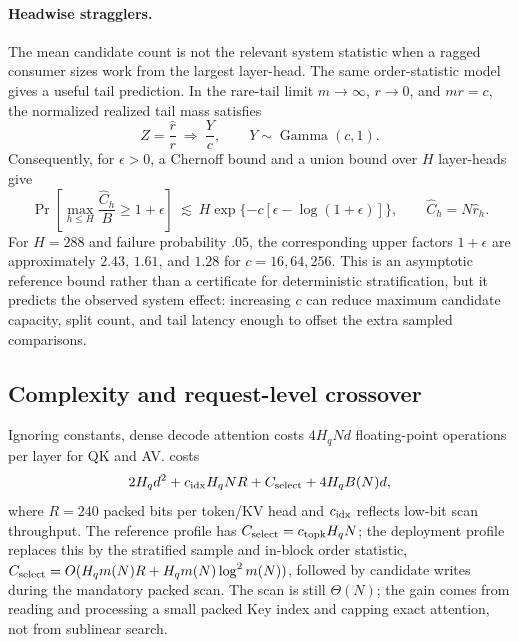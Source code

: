 \paragraph{Headwise stragglers.}
The mean candidate count is not the relevant system statistic when a ragged
consumer sizes work from the largest layer-head.  The same order-statistic
model gives a useful tail prediction.  In the rare-tail limit
$m\rightarrow\infty$, $r\rightarrow0$, and $mr=c$, the normalized realized
tail mass satisfies
\begin{equation}
 Z=\frac{\widehat r}{r}
 \ \Longrightarrow\ \frac{Y}{c},
 \qquad Y\sim\operatorname{Gamma}(c,1).
 \label{eq:quantile-gamma-limit}
\end{equation}
Consequently, for $\epsilon>0$, a Chernoff bound and a union bound over $H$
layer-heads give
\begin{equation}
 \Pr\!\left[
   \max_{h\le H}\frac{\widehat C_h}{B}\ge 1+\epsilon
 \right]
 \ \lesssim\
 H\exp\{-c[\epsilon-\log(1+\epsilon)]\},
 \qquad \widehat C_h=N\widehat r_h .
 \label{eq:quantile-headwise-straggler}
\end{equation}
For $H=288$ and failure probability $.05$, the corresponding upper factors
$1+\epsilon$ are approximately $2.43$, $1.61$, and $1.28$ for
$c=16,64,256$.  This is an asymptotic reference bound rather than a
certificate for deterministic stratification, but it predicts the observed
system effect: increasing $c$ can reduce maximum candidate capacity, split
count, and tail latency enough to offset the extra sampled comparisons.

\subsection{Complexity and request-level crossover}

Ignoring constants, dense decode attention costs $4H_qNd$ floating-point
operations per layer for QK and AV.
\method costs
\begin{equation}
 2H_qd^2+c_{\rm idx}H_qN R+
 C_{\rm select}+4H_qB(N)d,
 \label{eq:cost}
\end{equation}
where $R=240$ packed bits per token/KV head and $c_{\rm idx}$ reflects
low-bit scan throughput.  The reference profile has
$C_{\rm select}=c_{\rm topk}H_qN$; the deployment profile replaces this by
the stratified sample and in-block order statistic,
$C_{\rm select}=O(H_qm(N)R+H_qm(N)\log^2m(N))$, followed by candidate writes
during the mandatory packed scan.
The scan is still $\Theta(N)$; the gain comes from reading and processing a
small packed Key index and capping exact attention, not from sublinear search.

